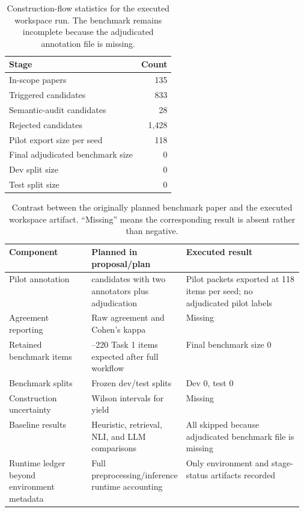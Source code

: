 \documentclass{article}
\begin{document}
\begin{table}[t]
\caption{Construction-flow statistics for the executed workspace run. The benchmark remains incomplete because the adjudicated annotation file is missing.}
\label{tab:flow}
\centering
\begin{tabular}{lr}
\toprule
Stage & Count \\
\midrule
In-scope papers & 135 \\
Triggered candidates & 833 \\
Semantic-audit candidates & 28 \\
Rejected candidates & 1{,}428 \\
Pilot export size per seed & 118 \\
Final adjudicated benchmark size & 0 \\
Dev split size & 0 \\
Test split size & 0 \\
\bottomrule
\end{tabular}
\end{table}

\begin{table}[t]
\caption{Contrast between the originally planned benchmark paper and the executed workspace artifact. ``Missing'' means the corresponding result is absent rather than negative.}
\label{tab:plan-gap}
\centering
\small
\begin{tabularx}{\linewidth}{>{\raggedright\arraybackslash}p{0.29\linewidth}>{\raggedright\arraybackslash}p{0.28\linewidth}X}
\toprule
Component & Planned in proposal/plan & Executed result \\
\midrule
Pilot annotation & 120 candidates with two annotators plus adjudication & Pilot packets exported at 118 items per seed; no adjudicated pilot labels \\
Agreement reporting & Raw agreement and Cohen's kappa & Missing \\
Retained benchmark items & 150--220 Task 1 items expected after full workflow & Final benchmark size 0 \\
Benchmark splits & Frozen dev/test splits & Dev 0, test 0 \\
Construction uncertainty & Wilson intervals for yield & Missing \\
Baseline results & Heuristic, retrieval, NLI, and LLM comparisons & All skipped because adjudicated benchmark file is missing \\
Runtime ledger beyond environment metadata & Full preprocessing/inference runtime accounting & Only environment and stage-status artifacts recorded \\
\bottomrule
\end{tabularx}
\end{table}
\end{document}
